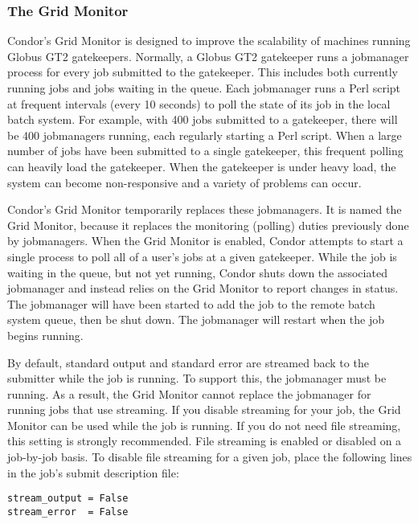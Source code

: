 \subsubsection{\label{sec:Condor-G-GridMonitor}The Grid Monitor}

Condor's Grid Monitor is designed to improve the scalability of
machines running Globus GT2 gatekeepers.
Normally, a Globus GT2 gatekeeper runs a jobmanager process for 
every job submitted to the gatekeeper.
This includes both currently running jobs and jobs waiting in the queue.
Each jobmanager runs a Perl script at
frequent intervals (every 10 seconds) to poll the state of its job in the local batch system.
For example, with 400 jobs submitted to a gatekeeper,
there will be 400 jobmanagers running,
each regularly starting a Perl script.
When a large number of jobs
have been submitted to a single gatekeeper,
this frequent polling can heavily load the gatekeeper.
When the gatekeeper is under heavy load,
the system can become non-responsive and a variety of problems can occur.

Condor's Grid Monitor temporarily replaces these jobmanagers.
It is named the Grid Monitor, because it replaces the monitoring
(polling) duties previously done by jobmanagers.
When the Grid Monitor is enabled,
Condor attempts to start a single
process to poll all of a user's jobs at a given gatekeeper.
While the job is waiting in the queue, but not yet running,
Condor shuts down the associated jobmanager and instead
relies on the Grid Monitor to report changes in status.
The jobmanager will have been started to add the job to the remote
batch system queue, then be shut down.
The jobmanager will restart when the job begins running.

By default, standard output and standard error are streamed back
to the submitter while the job is running.
To support this, the jobmanager must be running.
As a result, the Grid Monitor cannot
replace the jobmanager for running jobs that use streaming.
If you disable streaming for your job,
the Grid Monitor can be used while the job is running.
If you do not need file streaming, this setting is strongly recommended.
File streaming is enabled or disabled on a job-by-job basis.
To disable file streaming for a given job, place the
following lines in the job's submit description file:

\begin{verbatim}
stream_output = False
stream_error  = False
\end{verbatim}

